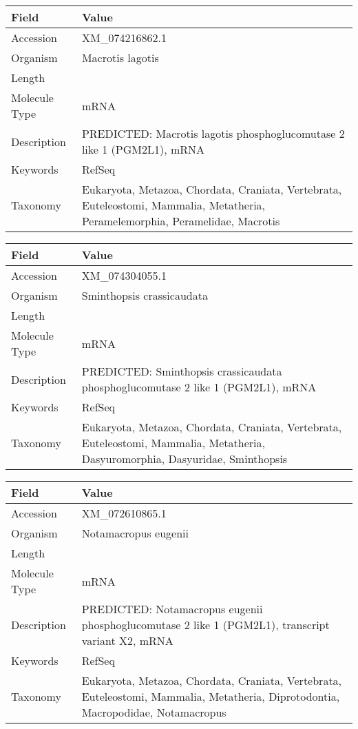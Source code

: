 \documentclass[10pt]{article}
\begin{document}
\vspace{1em}
{\footnotesize
\begin{longtable}{>{\raggedright\arraybackslash}p{4.5cm} >{\raggedright\arraybackslash}p{11.5cm}}
\textbf{Field} & \textbf{Value} \\
\hline
Accession & XM\_074216862.1 \\
Organism & Macrotis lagotis \\
Length & 9080 \\
Molecule Type & mRNA \\
Description & PREDICTED: Macrotis lagotis phosphoglucomutase 2 like 1 (PGM2L1), mRNA \\
Keywords & RefSeq \\
Taxonomy & Eukaryota, Metazoa, Chordata, Craniata, Vertebrata, Euteleostomi, Mammalia, Metatheria, Peramelemorphia, Peramelidae, Macrotis \\
\end{longtable}
}

\vspace{1em}
{\footnotesize
\begin{longtable}{>{\raggedright\arraybackslash}p{4.5cm} >{\raggedright\arraybackslash}p{11.5cm}}
\textbf{Field} & \textbf{Value} \\
\hline
Accession & XM\_074304055.1 \\
Organism & Sminthopsis crassicaudata \\
Length & 2919 \\
Molecule Type & mRNA \\
Description & PREDICTED: Sminthopsis crassicaudata phosphoglucomutase 2 like 1 (PGM2L1), mRNA \\
Keywords & RefSeq \\
Taxonomy & Eukaryota, Metazoa, Chordata, Craniata, Vertebrata, Euteleostomi, Mammalia, Metatheria, Dasyuromorphia, Dasyuridae, Sminthopsis \\
\end{longtable}
}

\vspace{1em}
{\footnotesize
\begin{longtable}{>{\raggedright\arraybackslash}p{4.5cm} >{\raggedright\arraybackslash}p{11.5cm}}
\textbf{Field} & \textbf{Value} \\
\hline
Accession & XM\_072610865.1 \\
Organism & Notamacropus eugenii \\
Length & 10230 \\
Molecule Type & mRNA \\
Description & PREDICTED: Notamacropus eugenii phosphoglucomutase 2 like 1 (PGM2L1), transcript variant X2, mRNA \\
Keywords & RefSeq \\
Taxonomy & Eukaryota, Metazoa, Chordata, Craniata, Vertebrata, Euteleostomi, Mammalia, Metatheria, Diprotodontia, Macropodidae, Notamacropus \\
\end{longtable}
}
\end{document}
